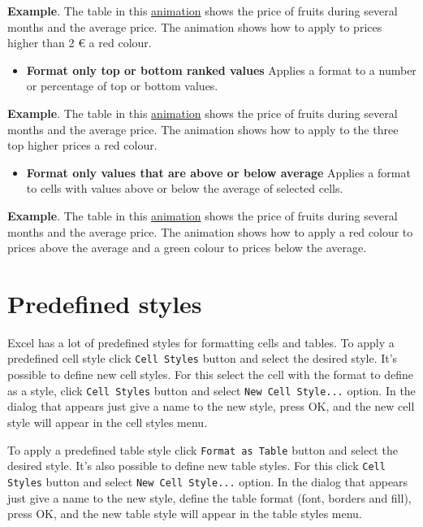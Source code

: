 \textbf{Example}. The table in this \href{http://aprendeconalf.es/office/excel/manual/img/example_conditional_formatting_logical_condition.gif}{animation} shows the price of fruits during several months and the average price. The animation shows how to apply to prices higher than 2 € a red colour.

\begin{itemize}
\item \textbf{Format only top or bottom ranked values} Applies a format to a number or percentage of top or bottom values.
\end{itemize}

\textbf{Example}. The table in this \href{http://aprendeconalf.es/office/excel/manual/img/example_conditional_formatting_top_values.gif}{animation} shows the price of fruits during several months and the average price. The animation shows how to apply to the three top higher prices a red colour.

\begin{itemize}
\item \textbf{Format only values that are above or below average} Applies a format to cells with values above or below the average of selected cells.
\end{itemize}

\textbf{Example}. The table in this \href{http://aprendeconalf.es/office/excel/manual/img/example_conditional_formatting_average.gif}{animation} shows the price of fruits during several months and the average price. The animation shows how to apply a red colour to prices above the average and a green colour to prices below the average.

\section{Predefined styles}\hypertarget{predefined-styles}{}\label{predefined-styles}

Excel has a lot of predefined styles for formatting cells and tables. To apply a predefined cell style click \texttt{Cell Styles} button and select the desired style. It's possible to define new cell styles. For this select the cell with the format to define as a style, click \texttt{Cell Styles} button
and select \texttt{New Cell Style...} option. In the dialog that appears just give a name to the new style, press OK, and the new cell style will appear in the cell styles menu.

To apply a predefined table style click \texttt{Format as Table} button and select the desired style. It's also possible to define new table styles. For this click \texttt{Cell Styles} button and select \texttt{New Cell Style...} option. In the dialog that appears just give a name to the new style, define the table format (font, borders and fill), press OK, and the new table style will appear in the table styles menu.

